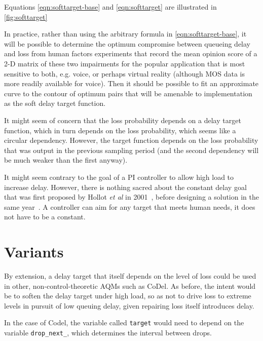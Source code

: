 Equations \ref{eqn:softtarget-base} and \ref{eqn:softtarget} are illustrated in \autoref{fig:softtarget}

In practice, rather than using the arbitrary formula in \autoref{eqn:softtarget-base}, it will be possible to determine the optimum compromise between queueing delay and loss from human factors experiments that record the mean opinion score of a 2-D matrix of these two impairments for the popular application that is most sensitive to both, e.g. voice, or perhaps virtual reality (although MOS data is more readily available for voice). Then it should be possible to fit an approximate curve to the contour of optimum pairs that will be amenable to implementation as the soft delay target function.

It might seem of concern that the loss probability depends on a delay target function, which in turn depends on the loss probability, which seems like a circular dependency. However, the target function depends on the loss probability that was output in the previous sampling period (and the second dependency will be much weaker than the first anyway).

It might seem contrary to the goal of a PI controller to allow high load to increase delay. However, there is nothing sacred about the constant delay goal that was first proposed by Hollot \emph{et al} in 2001~\cite{Hollot01b:Ctrl_Theoretic_RED}, before designing a solution in the same year~\cite{Hollot01a:PI_AQM}. A controller can aim for any target that meets human needs, it does not have to be a constant.

\section{Variants}\label{softtargettr_variants}

By extension, a delay target that itself depends on the level of loss could be used in other, non-control-theoretic AQMs such as CoDel. As before, the intent would be to soften the delay target under high load, so as not to drive loss to extreme levels in pursuit of low queuing delay, given repairing loss itself introduces delay. 

In the case of Codel, the variable called \texttt{target} would need to depend on the variable \texttt{drop\_next\_}, which determines the interval between drops. 


